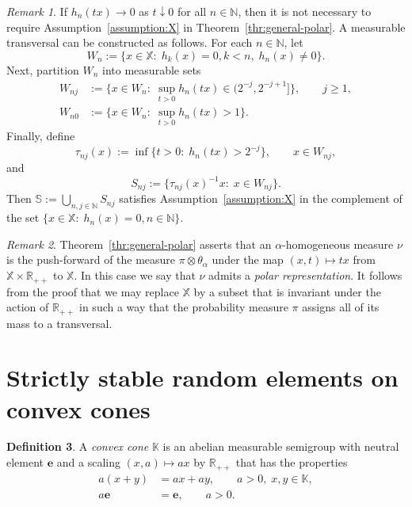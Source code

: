 \documentclass[12pt]{amsart}
\numberwithin{equation}{section}
\numberwithin{figure}{section}
\theoremstyle{plain} \newtheorem{theorem}{Theorem}[section]
\theoremstyle{plain} \newtheorem{proposition}[theorem]{Proposition}
\theoremstyle{plain} \newtheorem{lemma}[theorem]{Lemma}
\theoremstyle{plain} \newtheorem{corollary}[theorem]{Corollary}
\theoremstyle{definition} \newtheorem{definition}[theorem]{Definition}
\theoremstyle{definition} \newtheorem{notation}[theorem]{Notation}
\theoremstyle{remark} \newtheorem{remark}[theorem]{Remark}
\theoremstyle{remark} \newtheorem{example}[theorem]{Example}
\theoremstyle{definition} \newtheorem{assumption}{Assumption}
\newcommand{\bK}{\mathbb{K}}
\newcommand{\bN}{\mathbb{N}}
\newcommand{\bR}{\mathbb{R}}
\newcommand{\bS}{\mathbb{S}}
\newcommand{\bX}{\mathbb{X}}
\newcommand{\neutral}{\mathbf{e}}
\begin{document}
\begin{remark}
  \label{rem:sphere-from-h}
  If $h_n(tx)\to 0$ as $t\downarrow0$ for all $n\in\bN$, then it is
  not necessary to require Assumption~\ref{assumption:X} in
  Theorem~\ref{thr:general-polar}. A measurable transversal can be
  constructed as follows. For each $n\in\bN$, let
  \begin{displaymath}
    W_n:=\{x\in\bX:\; h_k(x)=0,k<n,\; h_n(x)\neq 0\}.
  \end{displaymath}
Next, partition $W_n$ into measurable sets
  \begin{align*}
    W_{nj}&:=\{x\in W_n:\; \sup_{t>0}
    h_n(tx)\in(2^{-j},2^{-j+1}]\},\qquad j\geq 1,\\
    W_{n0}&:=\{x\in W_n:\; \sup_{t>0}
    h_n(tx)>1\}.
  \end{align*}
  Finally, define
  \begin{displaymath}
    \tau_{nj}(x):=\inf\{t>0:\; h_n(tx)>2^{-j}\},\qquad x\in W_{nj},
  \end{displaymath}
  and
  \begin{displaymath}
    S_{nj}:=\{\tau_{nj}(x)^{-1}x:\; x\in W_{nj}\}. 
  \end{displaymath}
  Then $\bS:=\bigcup_{n,j\in\bN} S_{nj}$ satisfies
  Assumption~\ref{assumption:X} in the complement of the set
  $\{x\in\bX:\; h_n(x)=0,n\in\bN\}$.
\end{remark}

\begin{remark}
  Theorem~\ref{thr:general-polar} asserts that an $\alpha$-homogeneous
  measure $\nu$ is the push-forward of the measure $\pi\otimes
  \theta_\alpha$ under the map $(x,t)\mapsto tx$ from $\bX \times
  \bR_{++}$ to $\bX$. In this case we say that $\nu$ admits a
  \emph{polar representation}.  It follows from the proof that we may
  replace $\bX$ by a subset that is invariant under the action of
  $\bR_{++}$ in such a way that the probability measure $\pi$ assigns
  all of its mass to a transversal.
\end{remark}


\section{Strictly stable random elements on convex cones}
\label{sec:strictly-stable-rand}
\label{sec:convex-cones}

\begin{definition}
  A \emph{convex cone} $\bK$ is an abelian measurable
  semigroup with neutral element $\neutral$ and a scaling
  $(x,a) \mapsto a x$ by $\bR_{++}$ that has the properties
  \begin{align*}
    a(x+y)&=ax+ay,\qquad a>0,\;x,y\in\bK,\\
    a\neutral&=\neutral,\qquad a>0.
  \end{align*}
\end{definition}
\end{document}
